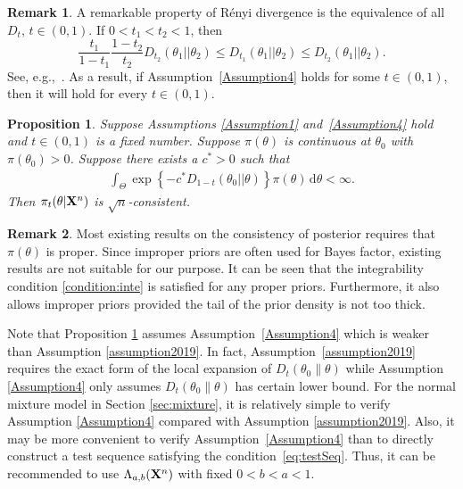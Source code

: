 \documentclass[11pt]{article}
\theoremstyle{plain}
\newtheorem{proposition}{\quad\quad Proposition}
\theoremstyle{definition}
\newtheorem{remark}{\quad\quad Remark}
\theoremstyle{remark}
\begin{document}
\begin{remark}
    A remarkable property of R\'{e}nyi divergence is the equivalence of all $D_{t}$, $t\in (0,1)$. If $0<t_1<t_2<1$, then
    $$
    \frac{t_1}{1-t_1}\frac{1-t_2}{t_2} D_{t_2}(\theta_1||\theta_2)
    \leq D_{t_1}(\theta_1||\theta_2)\leq D_{t_2}(\theta_1||\theta_2).
    $$
    See, e.g.,~\cite{Erven2014}.
    As a result, if Assumption~\ref{Assumption4} holds for some $t \in (0,1)$, then it will hold for every $t \in (0,1)$.
\end{remark}

\begin{proposition}\label{Theoremless1}
    Suppose Assumptions \ref{Assumption1} and~\ref{Assumption4} hold and $t\in(0,1)$ is a fixed number.
    Suppose $\pi(\theta)$ is continuous at $\theta_0$ with $\pi(\theta_0)>0$.
    Suppose there exists a $c^* > 0$ such that
    \begin{align}\label{condition:inte}
    \int_{\Theta } 
    \exp \left\{  - c^* D_{1-t}(\theta_0||\theta)  \right\} \pi(\theta) \, \mathrm d \theta
< \infty.
    \end{align}
Then $\pi_t(\theta | \mathbf{X}^{n})$ is $\sqrt n$-consistent.
\end{proposition}
\begin{remark}
    Most existing results on the consistency of posterior requires that $\pi(\theta)$ is proper.
    Since improper priors are often used for Bayes factor, existing results are not suitable for our purpose.
    It can be seen that the integrability condition \eqref{condition:inte}
    is satisfied for any proper priors.
    Furthermore, it also allows improper priors provided the tail of the prior density is not too thick. 
\end{remark}
Note that Proposition \ref{Theoremless1} assumes Assumption~\ref{Assumption4} which is weaker than Assumption \ref{assumption2019}.
In fact, Assumption~\ref{assumption2019} requires the exact form of the local expansion of $D_t(\theta_0 \| \theta)$ 
while Assumption \ref{Assumption4} only assumes $D_t(\theta_0 \| \theta)$ has certain lower bound.
For the normal mixture model in Section \ref{sec:mixture}, it is relatively simple to verify Assumption \ref{Assumption4} compared with Assumption \ref{assumption2019}.
Also, it may be more convenient to verify Assumption~\ref{Assumption4} than to directly construct a test sequence satisfying the condition~\eqref{eq:testSeq}.
Thus, it can be recommended to use $\Lambda_{a,b}(\mathbf{X}^n)$ with fixed $0< b< a< 1$.
\end{document}
